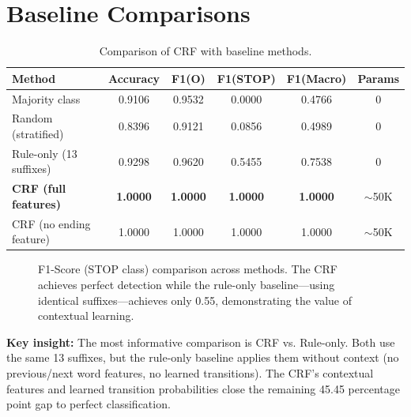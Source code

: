 \documentclass[12pt, a4paper, twoside]{report}
\begin{document}
\section{Baseline Comparisons}
\label{sec:baselines}

\begin{table}[htbp]
\centering
\caption{Comparison of CRF with baseline methods.}
\label{tab:baselines}
\begin{tabular}{lccccc}
\toprule
\textbf{Method} & \textbf{Accuracy} & \textbf{F1(O)} & \textbf{F1(STOP)} & \textbf{F1(Macro)} & \textbf{Params} \\
\midrule
Majority class & 0.9106 & 0.9532 & 0.0000 & 0.4766 & 0 \\
Random (stratified) & 0.8396 & 0.9121 & 0.0856 & 0.4989 & 0 \\
Rule-only (13 suffixes) & 0.9298 & 0.9620 & 0.5455 & 0.7538 & 0 \\
\midrule
\textbf{CRF (full features)} & \textbf{1.0000} & \textbf{1.0000} & \textbf{1.0000} & \textbf{1.0000} & $\sim$50K \\
CRF (no ending feature) & 1.0000 & 1.0000 & 1.0000 & 1.0000 & $\sim$50K \\
\bottomrule
\end{tabular}
\end{table}

\begin{figure}[htbp]
\centering
{}
\caption{F1-Score (STOP class) comparison across methods. The CRF achieves perfect detection while the rule-only baseline—using identical suffixes—achieves only 0.55, demonstrating the value of contextual learning.}
\label{fig:baselines}
\end{figure}

\textbf{Key insight:} The most informative comparison is CRF vs. Rule-only. Both use the same 13 suffixes, but the rule-only baseline applies them without context (no previous/next word features, no learned transitions). The CRF's contextual features and learned transition probabilities close the remaining 45.45 percentage point gap to perfect classification.
\end{document}
